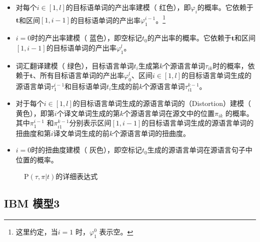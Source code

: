 \begin{itemize}
\vspace{0.5em}
\item 对每个$i\in[1,l]$的目标语单词的产出率建模（{\color{red!70} 红色}），即$\varphi_i$的概率。它依赖于$\mathbf{t}$和区间$[1,i-1]$的目标语单词的产出率$\varphi_1^{i-1}$。\footnote{这里约定，当$i=1$ 时，$\varphi_1^0$ 表示空。}
\vspace{0.5em}
\item $i=0$时的产出率建模（{\color{blue!70} 蓝色}），即空标记$t_0$的产出率的概率。它依赖于$\mathbf{t}$和区间$[1,i-1]$的目标语单词的产出率$\varphi_1^l$。
\vspace{0.5em}
\item 词汇翻译建模（{\color{green!70} 绿色}），目标语言单词$t_i$生成第$k$个源语言单词$\tau_{ik}$时的概率，依赖于$\mathbf{t}$、所有目标语言单词的产出率$\varphi_0^l$、区间$i\in[1,l]$的目标语言单词生成的源语言单词$\tau_1^{i-1}$和目标语单词$t_i$生成的前$k$个源语言单词$\tau_{i1}^{k-1}$。
\vspace{0.5em}
\item 对于每个$i\in[1,l]$的目标语言单词生成的源语言单词的{\small{}}（Distortion）建模（{\color{yellow!70!black} 黄色}），即第$i$个译文单词生成的第$k$个源语言单词在源文中的位置$\pi_{ik}$ 的概率。其中$\pi_1^{i-1}$ 和$\pi_{i1}^{k-1}$分别表示区间$[1,i-1]$的目标语言单词生成的源语言单词的扭曲度和第$i$译文单词生成的前$k$个源语言单词的扭曲度。
\vspace{0.5em}
\item $i=0$时的扭曲度建模（{\color{gray!70} 灰色}），即空标记$t_0$生成的源语言单词在源语言句子中位置的概率。
\end{itemize}

\begin{figure}[htp]
    \centering

   \caption{{$\textrm{P}(\tau,\pi|t)$}的详细表达式}
   \label{fig:3-31}
\end{figure}


\subsection{IBM 模型3}

